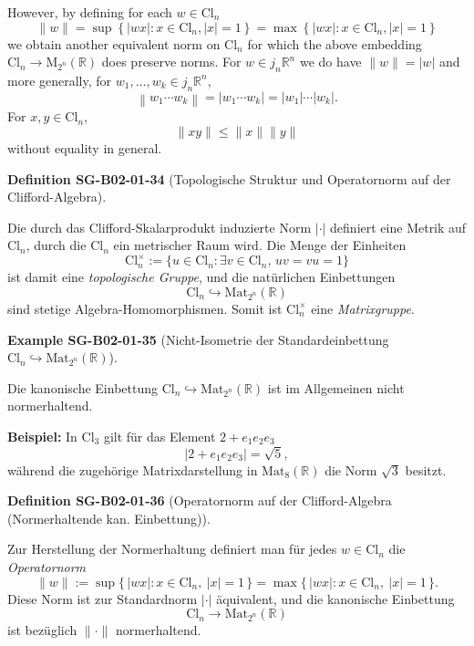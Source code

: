 \documentclass[10pt, letterpaper]{article}
\newcommand{\R}{\mathbb{R}}
\newcommand{\Cl}{\mathrm{Cl}}
\newcommand{\Mat}{\mathrm{Mat}}
\newcommand{\CustomHeading}[3]{%
  \par\medskip\noindent%
  \textbf{#1 #2} \textnormal{(#3)}.\enskip%
}
\newenvironment{DEF}[2]{\begin{unitbox}\CustomHeading{Definition}{#1}{#2}}{\end{unitbox}}
\newenvironment{EXA}[2]{\begin{unitbox}\CustomHeading{Example}{#1}{#2}}{\end{unitbox}}
\begin{document}
However, by defining for each $w \in \mathrm{Cl}_{n}$
$$
\|w\|=\sup \left\{|w x|: x \in \mathrm{Cl}_{n},|x|=1\right\}=\max \left\{|w x|: x \in \mathrm{Cl}_{n},|x|=1\right\}
$$
we obtain another equivalent norm on $\mathrm{Cl}_{n}$ for which the above embedding $\mathrm{Cl}_{n} \longrightarrow \mathrm{M}_{2^{n}}(\mathbb{R})$ does preserve norms. For $w \in j_{n} \mathbb{R}^{n}$ we do have $\|w\|=|w|$ and more generally, for $w_{1}, \ldots, w_{k} \in j_{n} \mathbb{R}^{n}$,
$$
\left\|w_{1} \cdots w_{k}\right\|=\left|w_{1} \cdots w_{k}\right|=\left|w_{1}\right| \cdots\left|w_{k}\right| .
$$
For $x, y \in \mathrm{Cl}_{n}$,
$$
\|x y\| \leqslant\|x\|\|y\|
$$
without equality in general.




\begin{DEF}{SG-B02-01-34}{Topologische Struktur und Operatornorm auf der Clifford-Algebra}
Die durch das Clifford-Skalarprodukt induzierte Norm $|\cdot|$ definiert eine Metrik auf $\Cl_n$, durch die $\Cl_n$ ein metrischer Raum wird.  
Die Menge der Einheiten
\[
\Cl_n^\times := \{u \in \Cl_n : \exists v \in \Cl_n, \, uv = vu = 1\}
\]
ist damit eine \emph{topologische Gruppe}, und die natürlichen Einbettungen
\[
\Cl_n \hookrightarrow \Mat_{2^n}(\R)
\]
sind stetige Algebra-Homomorphismen. Somit ist $\Cl_n^\times$ eine \emph{Matrixgruppe}.
\end{DEF}




\begin{EXA}{SG-B02-01-35}{Nicht-Isometrie der Standardeinbettung $\Cl_n \hookrightarrow \Mat_{2^n}(\R)$}
Die kanonische Einbettung $\Cl_n \hookrightarrow \Mat_{2^n}(\R)$ ist im Allgemeinen nicht normerhaltend.

\textbf{Beispiel:}  
In $\Cl_3$ gilt für das Element $2 + e_1 e_2 e_3$
\[
\lvert 2 + e_1 e_2 e_3\rvert = \sqrt{5},
\]
während die zugehörige Matrixdarstellung in $\Mat_8(\R)$ die Norm $\sqrt{3}$ besitzt.
\end{EXA}




\begin{DEF}{SG-B02-01-36}{Operatornorm auf der Clifford-Algebra (Normerhaltende kan. Einbettung)}
Zur Herstellung der Normerhaltung definiert man für jedes $w \in \Cl_n$ die \emph{Operatornorm}
\[
\lVert w\rVert := \sup\{\,|wx| : x \in \Cl_n,\ |x| = 1\,\} 
= \max\{\,|wx| : x \in \Cl_n,\ |x| = 1\,\}.
\]
Diese Norm ist zur Standardnorm $|\cdot|$ äquivalent, und die kanonische Einbettung
\[
\Cl_n \longrightarrow \Mat_{2^n}(\R)
\]
ist bezüglich $\lVert\cdot\rVert$ normerhaltend.
\end{DEF}
\end{document}

